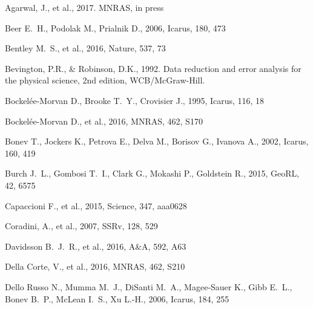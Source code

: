 \documentclass[a4paper,fleqn,usenatbib]{mnras}
\begin{document}
\begin{thebibliography}{99}

Agarwal, J., et al., 2017. MNRAS, in press

 Beer E.~H., Podolak M., Prialnik D., 2006, Icarus, 180, 473

 Bentley M.~S., et al., 2016, Nature, 537, 73 


Bevington, P.R., \& Robinson, D.K., 1992. Data reduction and error analysis for the physical science, 2nd edition, WCB/McGraw-Hill.


 Bockel{\'e}e-Morvan D., Brooke T.~Y., Crovisier J., 1995, Icarus, 116, 18


 Bockel{\'e}e-Morvan D., et al., 2016, MNRAS, 462, S170

 Bonev T., Jockers K., Petrova E., Delva M., Borisov G., Ivanova A., 2002, Icarus, 160, 419


 Burch J.~L., Gombosi T.~I., Clark G., Mokashi P., Goldstein R., 2015, GeoRL, 42, 6575 

 Capaccioni F., et al., 2015, Science, 347, aaa0628

 Coradini, A., et al., 2007, SSRv, 128, 529


 Davidsson B.~J.~R., et al., 2016, A\&A, 592, A63


 Della Corte, V., et al., 2016, MNRAS, 462, S210

 Dello Russo N., Mumma M.~J., DiSanti M.~A., Magee-Sauer K., Gibb E.~L., Bonev B.~P., McLean I.~S., Xu L.-H., 2006, Icarus, 184, 255




\end{thebibliography}
\end{document}
